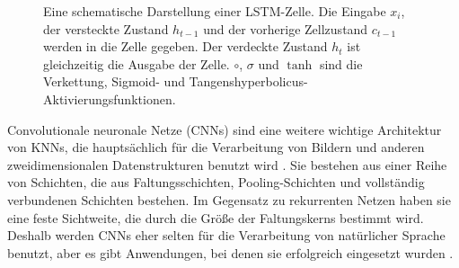 \begin{figure}
\label{fig:lstm}
\centering
\newcommand*{\connectorH}[4][]{
  \draw[#1] (#3) -| ($(#3) !#2! (#4)$) |- (#4);
}
\newcommand*{\connectorV}[4][]{
  \draw[#1] (#3) |- ($(#3) !#2! (#4)$) -| (#4);
}
\caption{Eine schematische Darstellung einer LSTM-Zelle. Die Eingabe $x_i$, der versteckte Zustand $h_{t-1}$ und der vorherige Zellzustand $c_{t-1}$ werden in die Zelle gegeben. Der verdeckte Zustand $h_t$ ist gleichzeitig die Ausgabe der Zelle. $\circ$, $\sigma$ und $\tanh$ sind die Verkettung, Sigmoid- und Tangenshyperbolicus-Aktivierungsfunktionen.}
\end{figure}

Convolutionale neuronale Netze (CNNs) sind eine weitere wichtige Architektur von KNNs, die hauptsächlich für die Verarbeitung von Bildern und anderen zweidimensionalen Datenstrukturen benutzt wird \cite{neocognitron}.
Sie bestehen aus einer Reihe von Schichten, die aus Faltungsschichten, Pooling-Schichten und vollständig verbundenen Schichten bestehen.
Im Gegensatz zu rekurrenten Netzen haben sie eine feste Sichtweite, die durch die Größe der Faltungskerns bestimmt wird.
Deshalb werden CNNs eher selten für die Verarbeitung von natürlicher Sprache benutzt, aber es gibt Anwendungen, bei denen sie erfolgreich eingesetzt wurden \cite{tdnn}.


